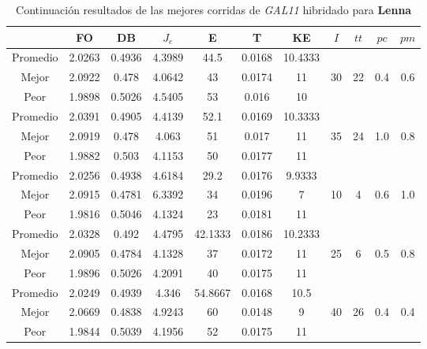 \begin{table}[h!]
    \footnotesize
    \begin{center}
        \begin{tabular}{|c|c|c|c|c|c|c|c|c|c|c|}
        \hline
             & {\bf FO} & {\bf DB} & $J_e$ & {\bf E} & {\bf T} & {\bf KE} & $I$ & $tt$ & $pc$ & $pm$ \\
        \hline
        \hline
            Promedio  & 2.0263 & 0.4936 & 4.3989 & 44.5 & 0.0168 & 10.4333 &  &  &  & \\
            \cline{1-7}
            Mejor & 2.0922 & 0.478  & 4.0642 & 43 & 0.0174 & 11 & 30 & 22 & 0.4 & 0.6\\
            \cline{1-7}
            Peor & 1.9898 & 0.5026  & 4.5405 & 53 & 0.016 & 10 &  &  &  & \\
        \hline
        \hline
            Promedio  & 2.0391 & 0.4905 & 4.4139 & 52.1 & 0.0169 & 10.3333 &  &  &  & \\
            \cline{1-7}
            Mejor & 2.0919 & 0.478  & 4.063 & 51 & 0.017 & 11 & 35 & 24 & 1.0 & 0.8\\
            \cline{1-7}
            Peor & 1.9882 & 0.503  & 4.1153 & 50 & 0.0177 & 11 &  &  &  & \\
        \hline
        \hline
            Promedio  & 2.0256 & 0.4938 & 4.6184 & 29.2 & 0.0176 & 9.9333 &  &  &  & \\
            \cline{1-7}
            Mejor & 2.0915 & 0.4781  & 6.3392 & 34 & 0.0196 & 7 & 10 & 4 & 0.6 & 1.0\\
            \cline{1-7}
            Peor & 1.9816 & 0.5046  & 4.1324 & 23 & 0.0181 & 11 &  &  &  & \\
        \hline
        \hline
            Promedio  & 2.0328 & 0.492 & 4.4795 & 42.1333 & 0.0186 & 10.2333 &  &  &  & \\
            \cline{1-7}
            Mejor & 2.0905 & 0.4784  & 4.1328 & 37 & 0.0172 & 11 & 25 & 6 & 0.5 & 0.8\\
            \cline{1-7}
            Peor & 1.9896 & 0.5026  & 4.2091 & 40 & 0.0175 & 11 &  &  &  & \\
        \hline
        \hline
            Promedio  & 2.0249 & 0.4939 & 4.346 & 54.8667 & 0.0168 & 10.5 &  &  &  & \\
            \cline{1-7}
            Mejor & 2.0669 & 0.4838  & 4.9243 & 60 & 0.0148 & 9 & 40 & 26 & 0.4 & 0.4\\
            \cline{1-7}
            Peor & 1.9844 & 0.5039  & 4.1956 & 52 & 0.0175 & 11 &  &  &  & \\
        \hline
        \end{tabular}
        \caption{Continuaci\'on resultados de las mejores corridas de \emph{GAL11} hibridado para {\bf Lenna}}
        \label{tb:tablecGAL11}
    \end{center}
\end{table}
